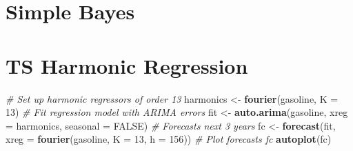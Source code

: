 \documentclass[]{book}
\newenvironment{Shaded}{\begin{snugshade}}{\end{snugshade}}
\newcommand{\CommentTok}[1]{\textcolor[rgb]{0.56,0.35,0.01}{\textit{#1}}}
\newcommand{\DataTypeTok}[1]{\textcolor[rgb]{0.13,0.29,0.53}{#1}}
\newcommand{\DecValTok}[1]{\textcolor[rgb]{0.00,0.00,0.81}{#1}}
\newcommand{\FloatTok}[1]{\textcolor[rgb]{0.00,0.00,0.81}{#1}}
\newcommand{\ImportTok}[1]{#1}
\newcommand{\KeywordTok}[1]{\textcolor[rgb]{0.13,0.29,0.53}{\textbf{#1}}}
\newcommand{\NormalTok}[1]{#1}
\newcommand{\OperatorTok}[1]{\textcolor[rgb]{0.81,0.36,0.00}{\textbf{#1}}}
\newcommand{\OtherTok}[1]{\textcolor[rgb]{0.56,0.35,0.01}{#1}}
\newcommand{\StringTok}[1]{\textcolor[rgb]{0.31,0.60,0.02}{#1}}
\begin{document}
\hypertarget{simple-bayes}{%
\section{Simple Bayes}\label{simple-bayes}}

\begin{Shaded}
\end{Shaded}

\hypertarget{ts-harmonic-regression}{%
\section{TS Harmonic Regression}\label{ts-harmonic-regression}}

\begin{Shaded}
\begin{Highlighting}[]
\CommentTok{# Set up harmonic regressors of order 13}
\NormalTok{harmonics <-}\StringTok{ }\KeywordTok{fourier}\NormalTok{(gasoline, }\DataTypeTok{K =} \DecValTok{13}\NormalTok{)}
\CommentTok{# Fit regression model with ARIMA errors}
\NormalTok{fit <-}\StringTok{ }\KeywordTok{auto.arima}\NormalTok{(gasoline, }\DataTypeTok{xreg =}\NormalTok{ harmonics, }\DataTypeTok{seasonal =} \OtherTok{FALSE}\NormalTok{)}
\CommentTok{# Forecasts next 3 years}
\NormalTok{fc <-}\StringTok{ }\KeywordTok{forecast}\NormalTok{(fit, }\DataTypeTok{xreg =} \KeywordTok{fourier}\NormalTok{(gasoline, }\DataTypeTok{K =} \DecValTok{13}\NormalTok{, }\DataTypeTok{h =} \DecValTok{156}\NormalTok{))}
\CommentTok{# Plot forecasts fc}
\KeywordTok{autoplot}\NormalTok{(fc)}
\end{Highlighting}
\end{Shaded}
\end{document}
